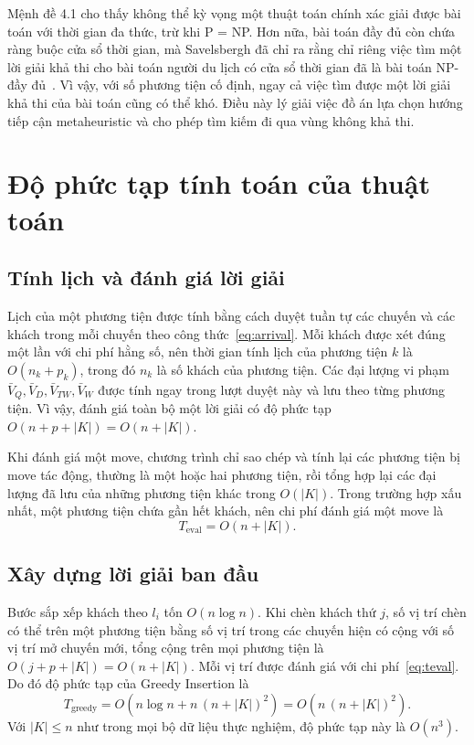 \documentclass[../DoAn.tex]{subfiles}
\begin{document}
Mệnh đề 4.1 cho thấy không thể kỳ vọng một thuật toán chính xác giải được bài toán với thời gian đa thức, trừ khi P = NP. Hơn nữa, bài toán đầy đủ còn chứa ràng buộc cửa sổ thời gian, mà Savelsbergh đã chỉ ra rằng chỉ riêng việc tìm một lời giải khả thi cho bài toán người du lịch có cửa sổ thời gian đã là bài toán NP-đầy đủ~\cite{savelsbergh1985local}. Vì vậy, với số phương tiện cố định, ngay cả việc tìm được một lời giải khả thi của bài toán cũng có thể khó. Điều này lý giải việc đồ án lựa chọn hướng tiếp cận metaheuristic và cho phép tìm kiếm đi qua vùng không khả thi.

\section{Độ phức tạp tính toán của thuật toán}
\label{sec:complexity}

\subsection{Tính lịch và đánh giá lời giải}

Lịch của một phương tiện được tính bằng cách duyệt tuần tự các chuyến và các khách trong mỗi chuyến theo công thức~\eqref{eq:arrival}. Mỗi khách được xét đúng một lần với chi phí hằng số, nên thời gian tính lịch của phương tiện $k$ là $O(n_k + p_k)$, trong đó $n_k$ là số khách của phương tiện. Các đại lượng vi phạm $\bar{V}_Q, \bar{V}_D, \bar{V}_{TW}, \bar{V}_W$ được tính ngay trong lượt duyệt này và lưu theo từng phương tiện. Vì vậy, đánh giá toàn bộ một lời giải có độ phức tạp $O(n + p + |K|) = O(n + |K|)$.

Khi đánh giá một move, chương trình chỉ sao chép và tính lại các phương tiện bị move tác động, thường là một hoặc hai phương tiện, rồi tổng hợp lại các đại lượng đã lưu của những phương tiện khác trong $O(|K|)$. Trong trường hợp xấu nhất, một phương tiện chứa gần hết khách, nên chi phí đánh giá một move là
\begin{equation}
T_{\text{eval}} = O(n + |K|).
\label{eq:teval}
\end{equation}

\subsection{Xây dựng lời giải ban đầu}

Bước sắp xếp khách theo $l_i$ tốn $O(n \log n)$. Khi chèn khách thứ $j$, số vị trí chèn có thể trên một phương tiện bằng số vị trí trong các chuyến hiện có cộng với số vị trí mở chuyến mới, tổng cộng trên mọi phương tiện là $O(j + p + |K|) = O(n + |K|)$. Mỗi vị trí được đánh giá với chi phí~\eqref{eq:teval}. Do đó độ phức tạp của Greedy Insertion là
\begin{equation}
T_{\text{greedy}} = O\!\left(n \log n + n\,(n + |K|)^2\right) = O\!\left(n\,(n + |K|)^2\right).
\end{equation}
Với $|K| \leq n$ như trong mọi bộ dữ liệu thực nghiệm, độ phức tạp này là $O(n^3)$.
\end{document}
